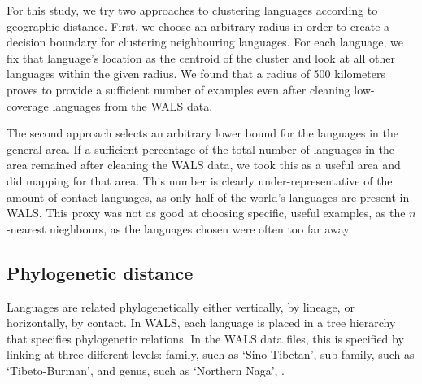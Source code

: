 \documentclass[11pt]{article}
\begin{document}
For this study, we try two approaches to clustering languages according to geographic distance. First, we choose an arbitrary radius in order to create a decision boundary for clustering neighbouring languages. For each language, we fix that language's location as the centroid of the cluster and look at all other languages within the given radius. We found that a radius of 500 kilometers proves to provide a sufficient number of examples even after cleaning low-coverage languages from the WALS data. 

The second approach selects an arbitrary lower bound for the languages in the general area. If a sufficient percentage of the total number of languages in the area remained after cleaning the WALS data, we took this as a useful area and did mapping for that area. 
This number is clearly under-representative of the amount of contact languages, as only half of the world's languages are present in WALS. This proxy was not as good at choosing specific, useful examples, as the $n$-nearest nieghbours, as the languages chosen were often too far away. 

\subsection{Phylogenetic distance}

Languages are related phylogenetically either vertically, by lineage, or horizontally, by contact. In WALS, each language is placed in a tree hierarchy that specifies phylogenetic relations. In the WALS data files, this is specified by linking at three different levels: family, such as `Sino-Tibetan', sub-family, such as `Tibeto-Burman', and genus, such as `Northern Naga', . %
\end{document}
